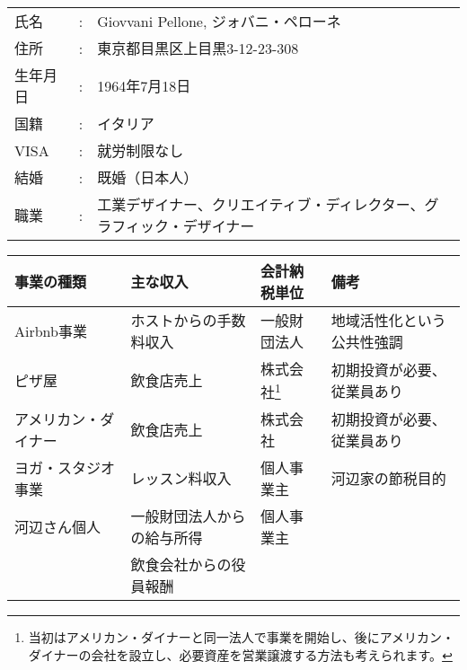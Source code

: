 \begin{table}[h]
  \begin{tabular}{lcp{28em}}
    氏名 & : & Giovvani Pellone, ジォバニ・ペローネ \\
    住所 & : & 東京都目黒区上目黒3-12-23-308 \\
    生年月日 & : & 1964年7月18日 \\
    国籍 & : & イタリア \\
    VISA & : & 就労制限なし \\
    結婚 & : & 既婚（日本人） \\
    職業 & : & 工業デザイナー、クリエイティブ・ディレクター、グラフィック・デザイナー \\
  \end{tabular}
\end{table}

\begin{minipage}{120mm}
  \begin{tabular}{llll}
\hline
 事業の種類   & 主な収入 & 会計納税単位 & 備考 \\
\hline
  Airbnb事業 & ホストからの手数料収入 & 一般財団法人 & 地域活性化という公共性強調 \\
  ピザ屋 & 飲食店売上 & 株式会社\footnote{当初はアメリカン・ダイナーと同一法人で事業を開始し、後にアメリカン・ダイナーの会社を設立し、必要資産を営業譲渡する方法も考えられます。} & 初期投資が必要、従業員あり \\
  アメリカン・ダイナー & 飲食店売上 & 株式会社 & 初期投資が必要、従業員あり \\
  ヨガ・スタジオ事業 & レッスン料収入 & 個人事業主 & 河辺家の節税目的 \\
  河辺さん個人 & 一般財団法人からの給与所得 & 個人事業主 & \\
  & 飲食会社からの役員報酬 &  & \\
  \hline
  \end{tabular}
\end{minipage}